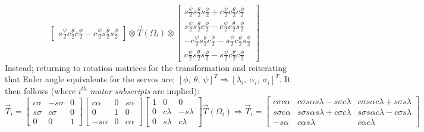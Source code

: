 {\begin{subequations}
\begin{equation}
\begin{bmatrix}
s\frac{\psi}{2}c\frac{\theta}{2}c\frac{\phi}{2}-c\frac{\psi}{2}s\frac{\theta}{2}s\frac{\phi}{2}
\end{bmatrix}
\otimes
\vec{T}(\Omega_i)
\otimes
\begin{bmatrix}
s\frac{\psi}{2}s\frac{\theta}{2}s\frac{\phi}{2}+c\frac{\psi}{2}c\frac{\theta}{2}c\frac{\phi}{2}\\
s\frac{\psi}{2}s\frac{\theta}{2}c\frac{\phi}{2}-c\frac{\psi}{2}c\frac{\theta}{2}s\frac{\phi}{2}\\
-c\frac{\psi}{2}s\frac{\theta}{2}c\frac{\phi}{2}-s\frac{\psi}{2}c\frac{\theta}{2}s\frac{\phi}{2}\\
c\frac{\psi}{2}s\frac{\theta}{2}s\frac{\phi}{2}-s\frac{\psi}{2}c\frac{\theta}{2}c\frac{\phi}{2}
\end{bmatrix}
\end{equation}
\end{subequations}
Instead; returning to rotation matrices for the transformation and reiterating that Euler angle equivalents for the servos are; $[\phi,~\theta,~\psi]^T\Rightarrow [\lambda_i,~\alpha_i,~\sigma_i]^T$. It then follows (where \emph{$i^{th}$ motor subscripts} are implied):
\begin{subequations}
\begin{equation}
\vec{T}_i=\begin{bmatrix}
c\sigma & -s\sigma & 0\\
s\sigma & c\sigma & 0\\
0 & 0 & 1 
\end{bmatrix}
\begin{bmatrix}
c\alpha & 0 & s\alpha\\
0 & 1 & 0\\
-s\alpha & 0 & c\alpha
\end{bmatrix}
\begin{bmatrix}
1 & 0 & 0\\
0 & c\lambda & -s\lambda\\
0 & s\lambda & c\lambda
\end{bmatrix}\vec{T}(\Omega_i)
\end{equation}
\begin{equation}
\Rightarrow\vec{T}_i=\begin{bmatrix}
c\sigma c\alpha & c\sigma s\alpha s\lambda - s\sigma c\lambda & c\sigma s\alpha c\lambda + s\sigma s\lambda\\
s\sigma c\alpha & s\sigma s\alpha s\lambda + c\sigma c\lambda & s\sigma s\alpha c\lambda - c\sigma s\lambda\\
-s\alpha & c\alpha s\lambda & c\alpha c\lambda

\end{bmatrix}
\end{equation}
\end{subequations}}
